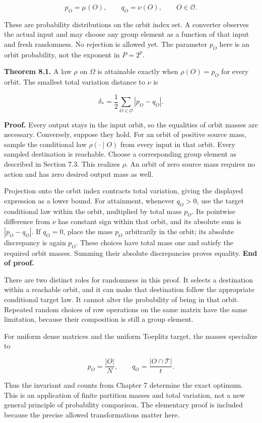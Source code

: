 \documentclass[
]{article}
\begin{document}
\[
p_O=\mu(O),\qquad q_O=\nu(O),\qquad O\in\mathscr O.
\]

These are probability distributions on the orbit index set. A converter
observes the actual input and may choose any group element as a function
of that input and fresh randomness. No rejection is allowed yet. The
parameter \(p_O\) here is an orbit probability, not the exponent in
\(P=2^p\).

\textbf{Theorem 8.1.} A law \(\rho\) on \(\Omega\) is attainable exactly
when \(\rho(O)=p_O\) for every orbit. The smallest total variation
distance to \(\nu\) is

\[
\delta_* =\frac12\sum_{O\in\mathscr O}|p_O-q_O|.
\]

\textbf{Proof.} Every output stays in the input orbit, so the equalities
of orbit masses are necessary. Conversely, suppose they hold. For an
orbit of positive source mass, sample the conditional law
\(\rho(\cdot\mid O)\) from every input in that orbit. Every sampled
destination is reachable. Choose a corresponding group element as
described in Section 7.3. This realizes \(\rho\). An orbit of zero
source mass requires no action and has zero desired output mass as well.

Projection onto the orbit index contracts total variation, giving the
displayed expression as a lower bound. For attainment, whenever
\(q_O>0\), use the target conditional law within the orbit, multiplied
by total mass \(p_O\). Its pointwise difference from \(\nu\) has
constant sign within that orbit, and its absolute sum is \(|p_O-q_O|\).
If \(q_O=0\), place the mass \(p_O\) arbitrarily in the orbit; its
absolute discrepancy is again \(p_O\). These choices have total mass one
and satisfy the required orbit masses. Summing their absolute
discrepancies proves equality. \textbf{End of proof.}

There are two distinct roles for randomness in this proof. It selects a
destination within a reachable orbit, and it can make that destination
follow the appropriate conditional target law. It cannot alter the
probability of being in that orbit. Repeated random choices of row
operations on the same matrix have the same limitation, because their
composition is still a group element.

For uniform dense matrices and the uniform Toeplitz target, the masses
specialize to

\[
p_O=\frac{|O|}{N},\qquad
q_O=\frac{|O\cap\mathcal T|}{t}.
\]

Thus the invariant and counts from Chapter 7 determine the exact
optimum. This is an application of finite partition masses and total
variation, not a new general principle of probability comparison. The
elementary proof is included because the precise allowed transformations
matter here.
\end{document}
